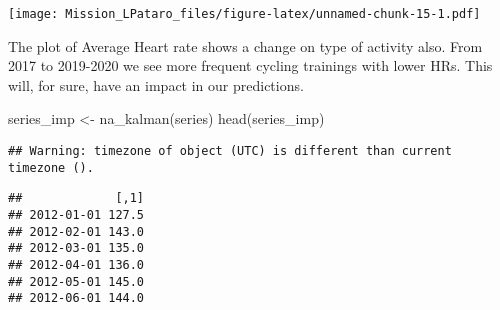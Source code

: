 \documentclass[
]{article}
\newenvironment{Shaded}{\begin{snugshade}}{\end{snugshade}}
\newcommand{\AttributeTok}[1]{\textcolor[rgb]{0.77,0.63,0.00}{#1}}
\newcommand{\DecValTok}[1]{\textcolor[rgb]{0.00,0.00,0.81}{#1}}
\newcommand{\FunctionTok}[1]{\textcolor[rgb]{0.00,0.00,0.00}{#1}}
\newcommand{\NormalTok}[1]{#1}
\newcommand{\OtherTok}[1]{\textcolor[rgb]{0.56,0.35,0.01}{#1}}
\newcommand{\SpecialCharTok}[1]{\textcolor[rgb]{0.00,0.00,0.00}{#1}}
\newcommand{\StringTok}[1]{\textcolor[rgb]{0.31,0.60,0.02}{#1}}
\begin{document}
\begin{Shaded}
\end{Shaded}

\texttt{[image: Mission\_LPataro\_files/figure-latex/unnamed-chunk-15-1.pdf]}

The plot of Average Heart rate shows a change on type of activity also.
From 2017 to 2019-2020 we see more frequent cycling trainings with lower
HRs. This will, for sure, have an impact in our predictions.

\begin{Shaded}
\begin{Highlighting}[]
\NormalTok{series\_imp }\OtherTok{\textless{}{-}} \FunctionTok{na\_kalman}\NormalTok{(series)}
\FunctionTok{head}\NormalTok{(series\_imp)}
\end{Highlighting}
\end{Shaded}

\begin{verbatim}
## Warning: timezone of object (UTC) is different than current timezone ().
\end{verbatim}

\begin{verbatim}
##             [,1]
## 2012-01-01 127.5
## 2012-02-01 143.0
## 2012-03-01 135.0
## 2012-04-01 136.0
## 2012-05-01 145.0
## 2012-06-01 144.0
\end{verbatim}
\end{document}
